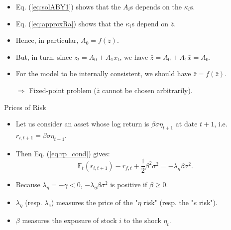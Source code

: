 \begin{frame}
\begin{scriptsize}
\begin{remark}\label{remark:fixedpoint}
\begin{itemize}
	\item Eq. (\ref{eq:solABY1}) shows that the $A_i$s depends on the $\kappa_i$s.
	\item Eq. (\ref{eq:approxRa}) shows that the $\kappa_i$s depend on $\bar{z}$.
	\item Hence, in particular, $A_0 = f(\bar{z})$.
	\item But, in turn, since $z_t = A_0 + A_1 x_t$, we have $\bar{z}=A_0 + A_1 \bar{x}=A_0$.
	\item For the model to be internally consistent, we should have $\bar{z}=f(\bar{z})$. 
	\item[$\Rightarrow$] Fixed-point problem ($\bar{z}$ cannot be chosen arbitrarily).
\end{itemize}
\end{remark}

\begin{exampleblock}{Prices of Risk}
\begin{itemize}
	\item Let us consider an asset whose log return is $\beta\sigma\eta_{t+1}$ at date $t+1$, i.e. $r_{i,t+1}=\beta\sigma\eta_{t+1}$.
	\item Then Eq. (\ref{eq:rp_cond}) gives:
	$$
	\mathbb{E}_t(r_{i,t+1}) -r_{f,t} + \frac{1}{2}\beta^2\sigma^2 = - \lambda_{\eta}\beta\sigma^2.
	$$
	\item Because $\lambda_{\eta}=-\gamma<0$, $ - \lambda_{\eta}\beta\sigma^2$ is positive if $\beta\ge0$.
	\item $\lambda_\eta$ (resp. $\lambda_{e}$) measures the price of the "$\eta$ risk" (resp. the "$e$ risk").
	\item $\beta$ measures the exposure of stock $i$ to the shock $\eta_{t}$.
\end{itemize}
\end{exampleblock}
\end{scriptsize}
\end{frame}




